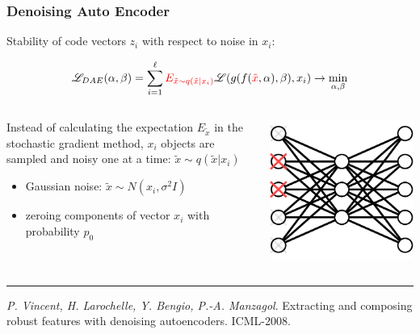 \documentclass[fullscreen=true, bookmarks=true, hyperref={pdfencoding=unicode}]{beamer}
\begin{document}
\begin{frame}
  \frametitle{Denoising Auto Encoder}

  Stability of code vectors $z_i$ with respect to noise in $x_i$:

  $$\mathscr{L}_{DAE}(\alpha, \beta) = \sum\limits_{i = 1}^\ell {\color{red} E_{\tilde x \sim q(\tilde x| x_i)}}
  \mathscr{L}(g(f({\color{red}\tilde x}, \alpha), \beta),x_i) \to \min\limits_{\alpha, \beta}$$

  \begin{columns}
      \begin{column}{.6\paperwidth}
        Instead of calculating the expectation $E_{\tilde x}$ in the stochastic gradient method, $x_i$ objects are sampled and noisy one at a time: $\tilde x \sim q(\tilde x|x_i)$
        \begin{itemize}
          \item Gaussian noise: $\tilde x \sim N(x_i, \sigma^2 I)$
          \item zeroing components of vector $x_i$ with probability $p_0$
        \end{itemize}
      \end{column}
      \begin{column}{.3\paperwidth}
        \includegraphics[keepaspectratio,
                       width=.3\paperwidth]{denoising-AE.png}
      \end{column}
  \end{columns}

  \noindent\rule{8cm}{0.4pt}

  {\footnotesize
  {\it P. Vincent, H. Larochelle, Y. Bengio, P.-A. Manzagol}. Extracting and composing robust features with denoising autoencoders. ICML-2008.}
\end{frame}
\end{document}
